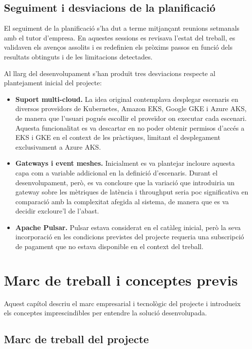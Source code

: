 \documentclass[11pt,a4paper]{article}
\newcommand{\sectionintro}[1]{%
  \vspace{0.25em}%
  #1\par
}
\begin{document}
\subsection{Seguiment i desviacions de la planificaci\'o}
El seguiment de la planificaci\'o s'ha dut a terme mitjan\c{c}ant reunions setmanals amb el tutor d'empresa. En aquestes sessions es revisava l'estat del treball, es validaven els aven\c{c}os assolits i es redefinien els pr\`oxims passos en funci\'o dels resultats obtinguts i de les limitacions detectades.

Al llarg del desenvolupament s'han produ\"it tres desviacions respecte al plantejament inicial del projecte:

\begin{itemize}
  \item \textbf{Suport multi-cloud.} La idea original contemplava desplegar escenaris en diversos prove\"idors de Kubernetes, Amazon EKS, Google GKE i Azure AKS, de manera que l'usuari pogu\'es escollir el prove\"idor on executar cada escenari. Aquesta funcionalitat es va descartar en no poder obtenir permisos d'acc\'es a EKS i GKE en el context de les pr\`actiques, limitant el desplegament exclusivament a Azure AKS.
  \item \textbf{Gateways i event meshes.} Inicialment es va plantejar incloure aquesta capa com a variable addicional en la definici\'o d'escenaris. Durant el desenvolupament, per\`o, es va concloure que la variaci\'o que introduiria un gateway sobre les m\`etriques de lat\`encia i throughput seria poc significativa en comparaci\'o amb la complexitat afegida al sistema, de manera que es va decidir excloure'l de l'abast.
  \item \textbf{Apache Pulsar.} Pulsar estava considerat en el cat\`aleg inicial, per\`o la seva incorporaci\'o en les condicions previstes del projecte requeria una subscripci\'o de pagament que no estava disponible en el context del treball.
\end{itemize}

\section{Marc de treball i conceptes previs}
\sectionintro{Aquest cap\'itol descriu el marc empresarial i tecnol\`ogic del projecte i introdueix els conceptes imprescindibles per entendre la soluci\'o desenvolupada.}

\subsection{Marc de treball del projecte}
\end{document}
